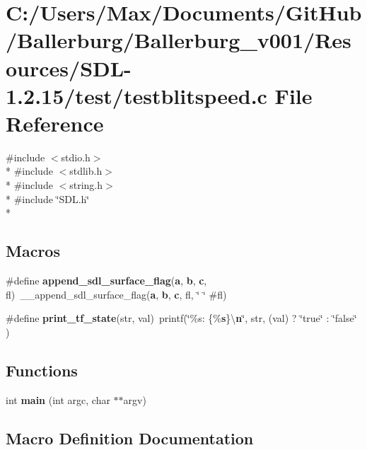 \section{C\+:/\+Users/\+Max/\+Documents/\+Git\+Hub/\+Ballerburg/\+Ballerburg\+\_\+v001/\+Resources/\+S\+D\+L-\/1.2.15/test/testblitspeed.c File Reference}
\label{testblitspeed_8c}
{\ttfamily \#include $<$stdio.\+h$>$}\\*
{\ttfamily \#include $<$stdlib.\+h$>$}\\*
{\ttfamily \#include $<$string.\+h$>$}\\*
{\ttfamily \#include \char`\"{}S\+D\+L.\+h\char`\"{}}\\*
\subsection*{Macros}
\begin{DoxyCompactItemize}
\item 
\#define {\bf append\+\_\+sdl\+\_\+surface\+\_\+flag}({\bf a},  {\bf b},  {\bf c},  fl)~\+\_\+\+\_\+append\+\_\+sdl\+\_\+surface\+\_\+flag({\bf a}, {\bf b}, {\bf c}, fl, \char`\"{} \char`\"{} \#fl)
\item 
\#define {\bf print\+\_\+tf\+\_\+state}(str,  val)~printf(\char`\"{}\%s\+: \{\%{\bf s}\}\textbackslash{}{\bf n}\char`\"{}, str, (val) ? \char`\"{}true\char`\"{} \+: \char`\"{}false\char`\"{} )
\end{DoxyCompactItemize}
\subsection*{Functions}
\begin{DoxyCompactItemize}
\item 
int {\bf main} (int argc, char $\ast$$\ast$argv)
\end{DoxyCompactItemize}


\subsection{Macro Definition Documentation}

